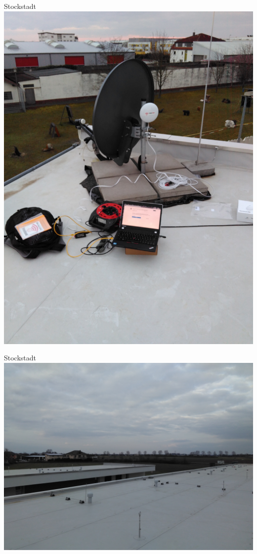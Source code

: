 \documentclass[t]{beamer}
\begin{document}
  \begin{frame}{Stockstadt}
    \center
    \includegraphics[height=0.75\textheight]{images/unterkunft-stockstadt-dach.jpg}
  \end{frame}

  \begin{frame}{Stockstadt}
    \center
    \includegraphics[height=0.75\textheight]{images/unterkunft-stockstadt-dach-aussicht.jpg}
  \end{frame}
\end{document}
